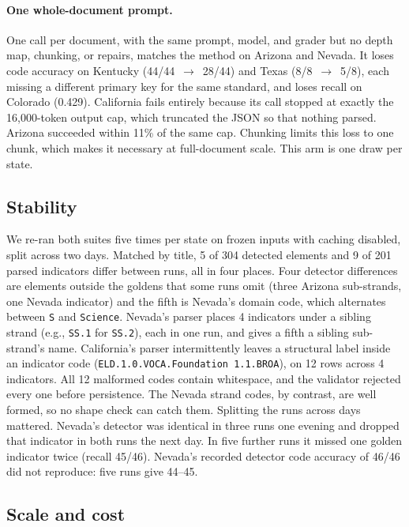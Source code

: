 \documentclass[11pt]{article}
\begin{document}
\paragraph{One whole-document prompt.} One call per document, with the same prompt, model, and grader but no depth map, chunking, or repairs, matches the method on Arizona and Nevada. It loses code accuracy on Kentucky (44/44~$\rightarrow$~28/44) and Texas (8/8~$\rightarrow$~5/8), each missing a different primary key for the same standard, and loses recall on Colorado (0.429). California fails entirely because its call stopped at exactly the 16{,}000-token output cap, which truncated the JSON so that nothing parsed. Arizona succeeded within 11\% of the same cap. Chunking limits this loss to one chunk, which makes it necessary at full-document scale. This arm is one draw per state.

\subsection{Stability}
\label{sec:eval-stability}

We re-ran both suites five times per state on frozen inputs with caching disabled, split across two days. Matched by title, 5 of 304 detected elements and 9 of 201 parsed indicators differ between runs, all in four places. Four detector differences are elements outside the goldens that some runs omit (three Arizona sub-strands, one Nevada indicator) and the fifth is Nevada's domain code, which alternates between \texttt{S} and \texttt{Science}. Nevada's parser places 4 indicators under a sibling strand (e.g., \texttt{SS.1} for \texttt{SS.2}), each in one run, and gives a fifth a sibling sub-strand's name. California's parser intermittently leaves a structural label inside an indicator code (\texttt{ELD.1.0.VOCA.Foundation 1.1.BROA}), on 12 rows across 4 indicators. All 12 malformed codes contain whitespace, and the validator rejected every one before persistence. The Nevada strand codes, by contrast, are well formed, so no shape check can catch them.
Splitting the runs across days mattered. Nevada's detector was identical in three runs
one evening and dropped that indicator in both runs the next day. In
five further runs it missed one golden indicator twice (recall 45/46). Nevada's recorded detector
code accuracy of 46/46 did not reproduce: five runs give 44--45.

\subsection{Scale and cost}
\label{sec:eval-scale}
\end{document}
